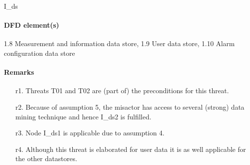 I\_ds

\paragraph{DFD element(s)}

1.8 Measurement and information data store, 1.9 User data store, 1.10 Alarm
configuration data store

\paragraph{Remarks}
	\begin{enumerate}
         \item[r1.] Threats T01 and T02 are (part of) the preconditions for
         this threat.
         \item[r2.] Because of assumption 5, the misactor has access to several
         (strong) data mining technique and hence I\_ds2 is fulfilled.
         \item[r3.] Node I\_ds1 is applicable due to assumption 4.
         \item[r4.] Although this threat is elaborated for user data it is as
         well applicable for the other datastores.
    \end{enumerate}
